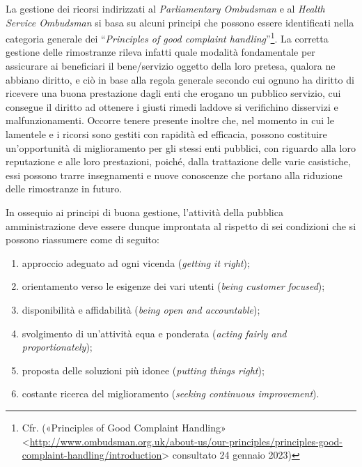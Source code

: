 \documentclass[12pt,it,a4paper,]{report}
\providecommand{\tightlist}{%
  \setlength{\itemsep}{0pt}\setlength{\parskip}{0pt}}
\begin{document}
La gestione dei ricorsi indirizzati al \emph{Parliamentary Ombudsman} e
al \emph{Health Service Ombudsman} si basa su alcuni principi che
possono essere identificati nella categoria generale dei
``\emph{Principles of good complaint handling}''\footnote{Cfr.
  ({«Principles of {Good Complaint Handling}»}
  \textless{}\url{http://www.ombudsman.org.uk/about-us/our-principles/principles-good-complaint-handling/introduction}\textgreater{}
  consultato 24 gennaio 2023)}. La corretta gestione delle rimostranze
rileva infatti quale modalità fondamentale per assicurare ai beneficiari
il bene/servizio oggetto della loro pretesa, qualora ne abbiano diritto,
e ciò in base alla regola generale secondo cui ognuno ha diritto di
ricevere una buona prestazione dagli enti che erogano un pubblico
servizio, cui consegue il diritto ad ottenere i giusti rimedi laddove si
verifichino disservizi e malfunzionamenti. Occorre tenere presente
inoltre che, nel momento in cui le lamentele e i ricorsi sono gestiti
con rapidità ed efficacia, possono costituire un'opportunità di
miglioramento per gli stessi enti pubblici, con riguardo alla loro
reputazione e alle loro prestazioni, poiché, dalla trattazione delle
varie casistiche, essi possono trarre insegnamenti e nuove conoscenze
che portano alla riduzione delle rimostranze in futuro.

In ossequio ai principi di buona gestione, l'attività della pubblica
amministrazione deve essere dunque improntata al rispetto di sei
condizioni che si possono riassumere come di seguito:

\begin{enumerate}
\def\labelenumi{\arabic{enumi})}
\tightlist
\item
  approccio adeguato ad ogni vicenda (\emph{getting it right});
\item
  orientamento verso le esigenze dei vari utenti (\emph{being customer
  focused});
\item
  disponibilità e affidabilità (\emph{being open and accountable});
\item
  svolgimento di un'attività equa e ponderata (\emph{acting fairly and
  proportionately});
\item
  proposta delle soluzioni più idonee (\emph{putting things right});
\item
  costante ricerca del miglioramento (\emph{seeking continuous
  improvement}).
\end{enumerate}
\end{document}
